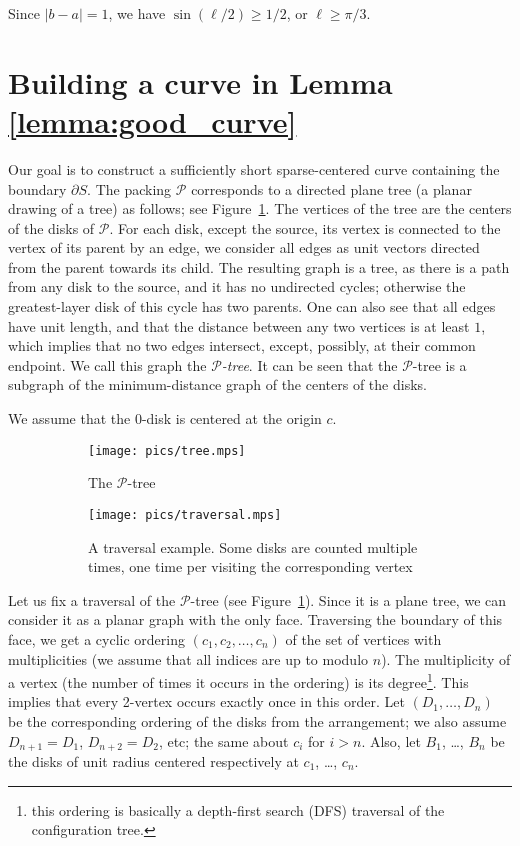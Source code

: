 Since $|b - a| = 1$, we have $\sin(\ell/2)\geq 1/2$, or $\ell\geq\pi/3$.

\section{Building a curve in Lemma \ref{lemma:good_curve}}

Our goal is to construct a sufficiently short sparse-centered curve containing the boundary $\partial S$. The packing $\mathcal{P}$ corresponds to a directed plane tree (a planar drawing of a tree) as follows; see Figure~\ref{fig:tree}. The vertices of the tree are the centers of the disks of $\mathcal{P}$. For each disk, except the source, its vertex is connected to the vertex of its parent by an edge, we consider all edges as unit vectors directed from the parent towards its child. The resulting graph is a tree, as there is a path from any disk to the source, and it has no undirected cycles; otherwise the greatest-layer disk of this cycle has two parents. One can also see that all edges have unit length, and that the distance between any two vertices is at least $1$, which implies that no two edges intersect, except, possibly, at their common endpoint. We call this graph the \textit{$\mathcal{P}$-tree}. It can be seen that the $\mathcal{P}$-tree is a subgraph of the minimum-distance graph of the centers of the disks.

We assume that the $0$-disk is centered at the origin $c$.

\begin{figure}[h!]
    \centering
    \begin{subfigure}[t]{.48\textwidth}
    \texttt{[image: pics/tree.mps]}
    \caption{The $\mathcal{P}$-tree}
    \end{subfigure}
    \begin{subfigure}[t]{.48\textwidth}
    \texttt{[image: pics/traversal.mps]}
    \caption{A traversal example. Some disks are counted multiple times, one time per visiting the corresponding vertex}
    \end{subfigure}
    \caption{}
    \label{fig:tree}
\end{figure}

Let us fix a traversal of the $\mathcal{P}$-tree (see Figure~\ref{fig:tree}). 
Since it is a plane tree, we can consider it as a planar graph with the only face. Traversing the boundary of this face, we get a cyclic ordering $(c_1, c_2, \ldots, c_n)$ of the set of vertices with multiplicities (we assume that all indices are up to modulo $n$). The multiplicity of a vertex (the number of times it occurs in the ordering) is its degree\footnote{this ordering is basically a depth-first search (DFS) traversal of the configuration tree.}.
This implies that every 2-vertex occurs exactly once in this order.
Let $(D_1, \ldots, D_n)$ be the corresponding ordering of the disks from the arrangement; we also assume $D_{n+1} = D_1$, $D_{n+2} = D_2$, etc; the same about $c_i$ for $i > n$. Also, let $B_1$, \ldots, $B_n$ be the disks of unit radius centered respectively at $c_1$, \ldots, $c_n$. %

